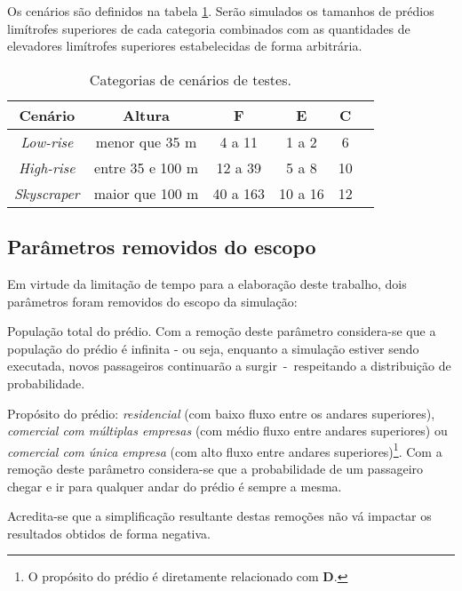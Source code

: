 Os cenários são definidos na tabela \ref{tab:cenarios}. Serão simulados os
tamanhos de prédios limítrofes superiores de cada categoria combinados com as
quantidades de elevadores limítrofes superiores estabelecidas de forma
arbitrária.

\begin{table}[htb!]
\centering
\caption{Categorias de cenários de testes.}
\label{tab:cenarios}
\begin{tabular}{|c|c|c|c|c|c|}
\hline
{\bf Cenário} & {\bf Altura} & {\bf F}  & {\bf E} & {\bf C}
\\ \hline
{\it Low-rise}   & menor que 35 m    & 4 a 11         & 1 a 2   & 6  \\ \hline
{\it High-rise}  & entre 35 e 100 m  & 12 a 39        & 5 a 8   & 10 \\ \hline
{\it Skyscraper} & maior que 100 m   & 40 a 163       & 10 a 16 & 12 \\ \hline
\end{tabular}
\end{table}

\subsection{Parâmetros removidos do escopo}

Em virtude da limitação de tempo para a elaboração deste trabalho, dois
parâmetros foram removidos do escopo da simulação:

\begin{description}[leftmargin=!,labelwidth=\widthof{\bfseries Pu}]
  \item[P]
  População total do prédio. Com a remoção deste parâmetro considera-se que a
  população do prédio é infinita - ou seja, enquanto a simulação estiver sendo
  executada, novos passageiros continuarão a surgir~-~respeitando a distribuição
  de probabilidade.

  \item[Pu]
  Propósito do prédio: \textit{residencial} (com baixo fluxo entre os andares
  superiores), \textit{comercial com múltiplas empresas} (com médio fluxo entre
  andares superiores) ou \textit{comercial com única empresa} (com alto fluxo
  entre andares superiores)\footnote{O propósito do prédio é diretamente
  relacionado com \textbf{D}.}. Com a remoção deste parâmetro considera-se que
  a probabilidade de um passageiro chegar e ir para qualquer andar do prédio é
  sempre a mesma.
\end{description}

Acredita-se que a simplificação resultante destas remoções não vá impactar os
resultados obtidos de forma negativa.
